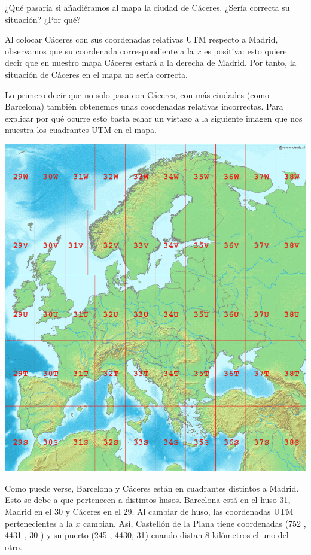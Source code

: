 \documentclass[11pt, a4paper, spanish, openright, twoside]{book}
\begin{document}
	\begin{section}{ ¿Qué pasaría si añadiéramos al mapa la ciudad de Cáceres. ¿Sería correcta su situación? ¿Por qué?}
	
		Al colocar Cáceres con sus coordenadas relativas UTM respecto a Madrid, observamos que su coordenada correspondiente 
		a la $x$ es positiva: esto quiere decir que en nuestro mapa Cáceres estará a la derecha de Madrid. Por tanto, la situación de Cáceres 
		en el mapa no sería correcta.

		Lo primero decir que no solo pasa con Cáceres,  con más ciudades (como Barcelona) también obtenemos unas coordenadas relativas 
		incorrectas. Para explicar por qué ocurre esto basta echar un vistazo a la siguiente imagen que nos muestra los cuadrantes UTM en
		el mapa.

	\begin{center}
	\includegraphics[scale=0.45]{mapaUTM}
	\end{center}
	
		Como puede verse, Barcelona y Cáceres están en cuadrantes distintos a Madrid.
		Esto se debe a que pertenecen a distintos husos. Barcelona está en el huso 31, Madrid en el 30 y Cáceres en el 29. Al cambiar de huso, 
		las coordenadas UTM pertenecientes a la $x$ cambian. Así, Castellón de la Plana tiene coordenadas (752 ,  4431 ,  30 ) y su puerto (245  ,  4430, 31) 
		cuando distan 8 kilómetros el uno del otro.

	\end{section}
\end{document}
